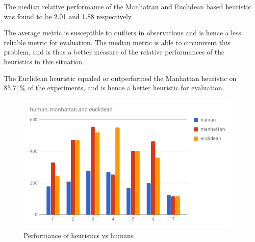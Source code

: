 The median relative performance of the Manhattan and Euclidean based heuristic was found to be 2.01 and 1.88 respectively.
 
The average metric is susceptible to outliers in observations and is hence a less reliable metric for evaluation. The median metric is able to circumvent this problem, and is thus a better measure of the relative performances of the heuristics in this situation.
  
The Euclidean heuristic equaled or outperformed the Manhattan heuristic on 85.71\% of the experiments, and is hence a better heuristic for evaluation.


\begin{figure}
  \includegraphics[width=\linewidth]{images/chart.png}
  \caption{Performance of heuristics vs humans}
  \label{fig:chart1}
\end{figure}
